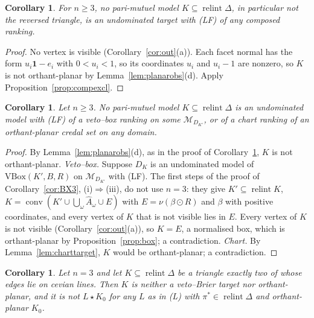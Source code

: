 \documentclass[11pt]{article}
\newcommand{\one}{\mathbf{1}}
\newcommand{\M}{\mathcal{M}}
\DeclareMathOperator{\conv}{conv}
\DeclareMathOperator{\relint}{relint}
\theoremstyle{plain}
\newtheorem{corollary}[theorem]{Corollary}
\theoremstyle{definition}
\theoremstyle{remark}
\begin{document}
\begin{corollary}\label{cor:comppmm}
For $n\ge3$, no pari-mutuel model $K\subseteq\relint\Delta$, in particular not the
reversed triangle, is an undominated target with (LF) of any composed ranking.
\end{corollary}

\begin{proof}
No vertex is visible (Corollary~\ref{cor:out}(a)). Each facet normal has the form
$u_i\one-e_i$ with $0<u_i<1$, so its coordinates $u_i$ and $u_i-1$ are nonzero, so $K$ is not orthant-planar by
Lemma~\ref{lem:planarobs}(d). Apply Proposition~\ref{prop:compexcl}.
\end{proof}

\begin{corollary}\label{cor:pmmvbox}
Let $n\ge3$. No pari-mutuel model $K\subseteq\relint\Delta$ is an undominated model with
(LF) of a veto--box ranking on some $\M_{D_{K'}}$, or of a chart ranking of an
orthant-planar credal set on any domain.
\end{corollary}

\begin{proof}
By Lemma~\ref{lem:planarobs}(d), as in the proof of Corollary~\ref{cor:comppmm}, $K$ is not
orthant-planar. \emph{Veto--box.} Suppose $D_K$ is an undominated model of
$\mathrm{VBox}(K',B,R)$ on $\M_{D_{K'}}$ with (LF). The first steps of the proof of
Corollary~\ref{cor:BX3}, (i)$\Rightarrow$(iii), do not use $n=3$: they give $K'\subseteq
\relint K$, $K=\conv(K'\cup\bigcup_\omega\hat A_\omega\cup E)$ with $E=\nu(\beta\odot R)$
and $\beta$ with positive coordinates, and every vertex of $K$ that is not visible lies in
$E$. Every vertex of $K$ is not visible (Corollary~\ref{cor:out}(a)), so $K=E$, a
normalised box, which is orthant-planar by Proposition~\ref{prop:box}; a contradiction.
\emph{Chart.} By Lemma~\ref{lem:charttarget}, $K$ would be orthant-planar; a contradiction.
\end{proof}

\begin{corollary}\label{cor:twocevian}
Let $n=3$ and let $K\subseteq\relint\Delta$ be a triangle exactly two of whose edges lie on
cevian lines. Then $K$ is neither a veto--Brier target nor orthant-planar, and it is not
$L\star K_0$ for any $L$ as in (L) with $\pi^\ast\in\relint\Delta$ and orthant-planar
$K_0$.
\end{corollary}
\end{document}
